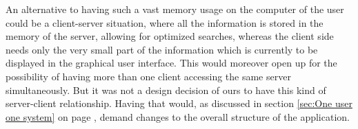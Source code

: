 An alternative to having such a vast memory usage on the computer of the user could be a client-server situation, where all the information is stored in the memory of the server, allowing for optimized searches, whereas the client side needs only the very small part of the information which is currently to be displayed in the graphical user interface. This would moreover open up for the possibility of having more than one client accessing the same server simultaneously. But it was not a design decision of ours to have this kind of server-client relationship. Having that would, as discussed in section \ref{sec:One user one system} on page \pageref{sec:One user one system}, demand changes to the overall structure of the application.